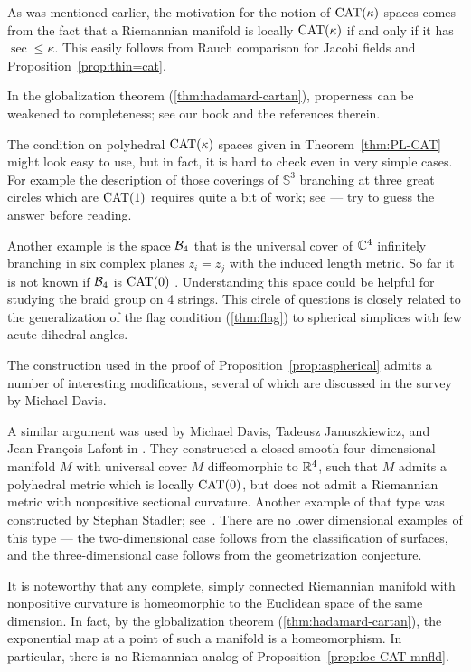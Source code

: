 As was mentioned earlier, the motivation for the notion of $\mathrm{CAT}(\kappa)$ spaces comes from the fact that a Riemannian manifold is locally  $\mathrm{CAT}(\kappa)$ if and only if it has $\sec\le\kappa$.
This easily follows from Rauch comparison for Jacobi fields and Proposition~\ref{prop:thin=cat}.

In the globalization theorem (\ref{thm:hadamard-cartan}), properness can be weakened to completeness; see our book \cite{alexander-kapovitch-petrunin-2025} and the references therein.

The condition on polyhedral $\mathrm{CAT}(\kappa)$ spaces given in Theorem~\ref{thm:PL-CAT} might look easy to use, 
but in fact, it is hard to check even in very simple cases.
For example the description of those coverings of $\mathbb{S}^3$ branching at three 
great circles which are $\mathrm{CAT}(1)$ requires quite a bit of work;
see \cite{charney-davis-1993} --- try to guess the answer before reading.

Another example is the space $\mathcal{B}_4$ that  is the universal cover of $\mathbb{C}^4$ infinitely branching in six complex planes $z_i=z_j$ with the induced length metric.
So far it is not known if $\mathcal{B}_4$ is $\mathrm{CAT}(0)$ \cite{panov-petrunin-2016}.
Understanding this space could be helpful for studying the braid group on 4 strings.
This circle of questions is closely related to the generalization of the flag condition (\ref{thm:flag}) to  spherical simplices with few acute dihedral angles.


The construction used in the proof of  Proposition~\ref{prop:aspherical} admits a number of interesting modifications,  
several of which are discussed in the survey \cite{davis-2001} by Michael Davis.

A similar argument was used by Michael Davis, 
Tadeusz Ja\-nu\-szkie\-wicz,
and  Jean-Fran\c{c}ois Lafont in \cite{davis-januszkiewicz-lafont}.
They constructed a closed smooth four-dimensional manifold $M$ with  universal cover $\tilde M$ diffeomorphic to $\mathbb{R}^4$, such that $M$ admits a polyhedral metric which is locally $\mathrm{CAT}(0)$, but does not admit a Riemannian metric with nonpositive sectional curvature.
Another example of that type was constructed by Stephan Stadler; see~\cite{stadler}.
There are no lower dimensional examples of this type ---
the two-dimensional case follows from the  classification of surfaces,
and 
the three-dimensional case follows from the geometrization conjecture.

It is noteworthy that any complete, simply connected Riemannian manifold with nonpositive curvature is homeomorphic to the Euclidean space of the same dimension.
In fact, by the globalization theorem
(\ref{thm:hadamard-cartan}), 
the exponential map at a point of such a manifold is a homeomorphism.
In particular, there is no Riemannian analog of Proposition~\ref{prop:loc-CAT-mnfld}.

